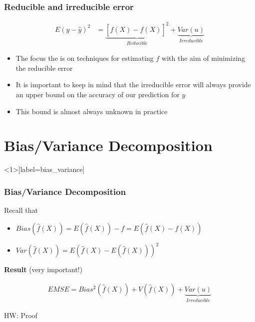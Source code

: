 \documentclass[
  shownotes,
  xcolor={svgnames},
  hyperref={colorlinks,citecolor=DarkBlue,linkcolor=andesred,urlcolor=DarkBlue}
  , aspectratio=169]{beamer}
\begin{document}
\begin{frame}
\frametitle{Reducible and irreducible error}

\begin{align}
E(y-\hat y)^2  &= \underset{Reducible}{\underbrace{[f(X)-\hat{f}(X)]^{2}}}+\underset{Irreducible}{\underbrace{Var(u)}}
\end{align}
\bigskip
\begin{itemize}
\item The focus the is on techniques for estimating $f$ with the aim of minimizing the reducible error
\medskip
\item It is important to keep in mind that the irreducible error will always provide an upper bound on the accuracy of our prediction for $y$
\medskip
\item This bound is almost always unknown in practice
\end{itemize}


\end{frame}

\section{Bias/Variance Decomposition}

\begin{frame}<1>[label=bias_variance]
\frametitle{Bias/Variance Decomposition}

Recall that 
\begin{itemize}
  \item $Bias (\hat f(X) )=E (\hat f(X) )-f=E (\hat f(X)-f(X))$
  \item  $Var (\hat f(X))  =E (\hat f(X) - E (\hat f(X)))^2$
\end{itemize}
\pause
\bigskip
{\bf Result} (very important!)
\bigskip

\begin{align}
  EMSE = Bias^2 (\hat f(X))+V (\hat f(X)) +\underset{Irreducible}{\underbrace{Var(u)}}
\end{align}

{\tiny HW: Proof}

\end{frame}
\end{document}
